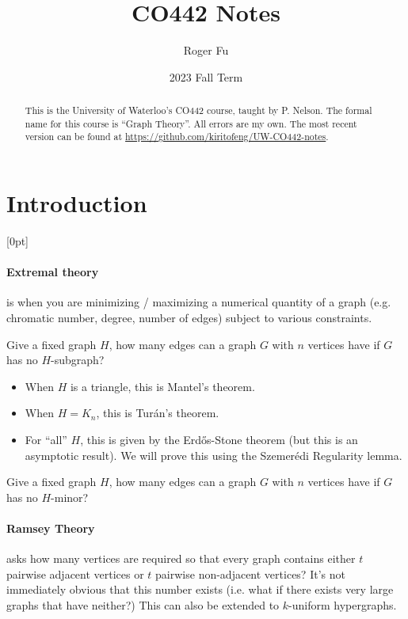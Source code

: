 \documentclass{scrartcl}
\author{Roger Fu}
\date{2023 Fall Term}
\title{CO442 Notes}
\newcommand*{\rmnote}[2][0pt]{\reversemarginpar{}\marginnote{\footnotesize #2}[#1]\normalmarginpar{}}
\newcommand*{\lecture}[1]{\rmnote{\ttfamily #1}}
\begin{document}
\maketitle
\begin{abstract}
  This is the University of Waterloo's CO442 course, taught by P. Nelson.
  The formal name for this course is ``Graph Theory''.
  All errors are my own.
  The most recent version can be found at \url{https://github.com/kiritofeng/UW-CO442-notes}.
\end{abstract}

\tableofcontents
\clearpage
\section{Introduction}\lecture{Thu Sep 07}
\paragraph{Extremal theory} is when you are minimizing / maximizing a numerical
quantity of a graph (e.g. chromatic number, degree, number of edges)
subject to various constraints.

\begin{question*}
  Give a fixed graph $H$, how many edges can a graph $G$ with $n$ vertices have
  if $G$ has no $H$-subgraph?
\end{question*}
\begin{itemize}
  \item When $H$ is a triangle, this is Mantel's theorem.
  \item When $H = K_n$, this is Tur\'an's theorem.
  \item For ``all'' $H$, this is given by the Erd\H{o}s-Stone theorem
    (but this is an asymptotic result).
    We will prove this using the Szemer\'edi Regularity lemma.
\end{itemize}

\begin{question*}
  Give a fixed graph $H$, how many edges can a graph $G$ with $n$ vertices have
  if $G$ has no $H$-minor?
\end{question*}

\paragraph{Ramsey Theory} asks how many vertices are required so that every graph
contains either $t$ pairwise adjacent vertices or $t$ pairwise non-adjacent
vertices?
It's not immediately obvious that this number exists (i.e. what if there exists
very large graphs that have neither?)
This can also be extended to $k$-uniform hypergraphs.
\end{document}

